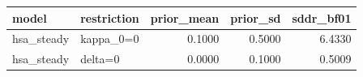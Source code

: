 \begin{tabular}{llrrr}
\toprule
model & restriction & prior\_mean & prior\_sd & sddr\_bf01 \\
\midrule
hsa\_steady & kappa\_0=0 & 0.1000 & 0.5000 & 6.4330 \\
hsa\_steady & delta=0 & 0.0000 & 0.1000 & 0.5009 \\
\bottomrule
\end{tabular}
